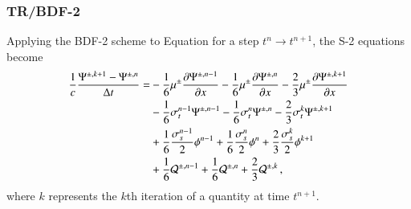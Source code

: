 \subsubsection{TR/BDF-2}
Applying the BDF-2 scheme to Equation  for a step
$t^{n}\rightarrow t^{n+1}$, the S-2 equations become
\begin{equation}\lequ{S2BDF2}\begin{split}
  \frac{1}{c}\frac{\Psi^{\pm,k+1}-\Psi^{\pm,n}}{\dt} = &
  -\sixth\mu^\pm\dydx{\Psi^{\pm,n-1}}
  -\sixth\mu^\pm\dydx{\Psi^{\pm,n}}
  -\frac{2}{3}\mu^\pm\dydx{\Psi^{\pm,k+1}}\\
  &-\sixth\sigma_t^{n-1}\Psi^{\pm,n-1}
   -\sixth\sigma_t^{n}  \Psi^{\pm,n}
   -\frac{2}{3}\sigma_t^k\Psi^{\pm,k+1}\\
  &+\sixth\frac{\sigma_s^{n-1}}{2}\phi^{n-1}
   +\sixth\frac{\sigma_s^{n}}{2}  \phi^{n}
   +\frac{2}{3}\frac{\sigma_s^k}{2}\phi^{k+1}\\
  &+\sixth\Q^{\pm,n-1}
   +\sixth\Q^{\pm,n}
   +\frac{2}{3}\Q^{\pm,k} \pec
\end{split}\end{equation}
where $k$ represents the $k$th iteration of a quantity at time $t^{n+1}$.
